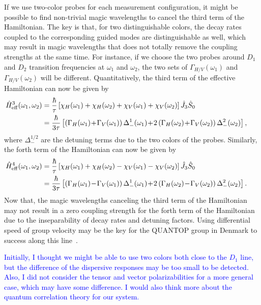 If we use two-color probes for each measurement configuration, it might be possible to find non-trivial magic wavelengths to cancel the third term of the Hamiltonian. The key is that, for two distinguishable colors, the decay rates coupled to the corresponding guided modes are distinguishable as well, which may result in magic wavelengths that does not totally remove the coupling strengths at the same time. For instance, if we choose the two probes around $ D_1 $ and $ D_2 $ transition frequencies at $ \omega_1 $ and $ \omega_2 $, the two sets of $ \Gamma_{H/V}(\omega_1) $ and $ \Gamma_{H/V}(\omega_2) $ will be different. Quantitatively, the third term of the effective Hamiltonian can now be given by
\begin{align}
\!\!\!\!\!\!\!\!\!\!\hat{H}_{\rm eff}^3(\omega_1,\omega_2) &= \frac{\hbar}{\tau} \left[\chi_H(\omega_1)+\chi_H(\omega_2) + \chi_V(\omega_1)+\chi_V(\omega_2) \right] \hat{J}_3\hat{S}_0\\
&= \frac{\hbar}{3\tau} \left[  \left( \Gamma_H(\omega_1)\!+\!\Gamma_V(\omega_1) \right)\Delta_-^1(\omega_1) \!+\! 2\left( \Gamma_H(\omega_2)\!+\!\Gamma_V(\omega_2) \right)\Delta_-^2(\omega_2) \right] ,
\end{align}
where $ \Delta_-^{1/2} $ are the detuning terms due to the two colors of the probes. Similarly, the forth term of the Hamiltonian can now be given by
\begin{align}
\!\!\!\!\!\!\!\!\!\!\hat{H}_{\rm eff}^4(\omega_1,\omega_2) &= \frac{\hbar}{\tau} \left[\chi_H(\omega_1)+\chi_H(\omega_2) - \chi_V(\omega_1)-\chi_V(\omega_2) \right] \hat{J}_3\hat{S}_0\\
&= \frac{\hbar}{3\tau} \left[  \left( \Gamma_H(\omega_1)\!-\!\Gamma_V(\omega_1) \right)\Delta_-^1(\omega_1) \!+\! 2\left( \Gamma_H(\omega_2)\!-\!\Gamma_V(\omega_2) \right)\Delta_-^2(\omega_2) \right] .
\end{align}
Now that, the magic wavelengths canceling the third term of the Hamiltonian may not result in a zero coupling strength for the forth term of the Hamiltonian due to the inseparability of decay rates and detuning factors. Using differential speed of group velocity may be the key for the QUANTOP group in Denmark to success along this line~\cite{Beguin2014}. 

\textcolor{blue}{Initially, I thought we might be able to use two colors both close to the $ D_1 $ line, but 
the difference of the dispersive responses may be too small to be detected. Also, I did not consider the 
tensor and vector polarizabilities for a more general case, which may have some difference. I would also 
think more about the quantum correlation theory for our system. }

